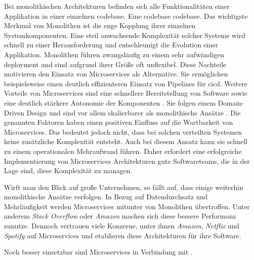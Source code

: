 Bei monolithischen Architekturen befinden sich alle Funktionalitäten einer Applikation in einer einzelnen \Gls{codebase}. Eine \Gls{codebase} \glsdesc{codebase}. Das wichtigste Merkmal von Monolithen ist die enge Kopplung ihrer einzelnen Systemkomponenten. Eine steil anwachsende Komplexität solcher Systeme wird schnell zu einer Herausforderung und entschleunigt die Evolution einer Applikation. \cite{028:Analyzing-Microservices-and-Monolithic-Systems} Monolithen führen zwangsläufig zu einem sehr aufwändigen \Gls{deployment} und sind aufgrund ihrer Größe oft unflexibel. Diese Nachteile motivieren den Einsatz von Microservices als Alternative. Sie ermöglichen beispielsweise einen deutlich effizienteren Einsatz von Pipelines für \Gls{cicd}. \cite{019:Advanced-DevOps-Environment-for-Microservices-based-Applications} Weitere Vorteile von Microservices sind eine schnellere Bereitstellung von Software sowie eine deutlich stärkere Autonomie der Komponenten \cite{019:Advanced-DevOps-Environment-for-Microservices-based-Applications,027:Containerized-Microservices-Deployment-Approach}. Sie folgen einem Domain-Driven Design \cite{019:Advanced-DevOps-Environment-for-Microservices-based-Applications} und sind vor allem skalierbarer als monolithische Ansätze \cite{019:Advanced-DevOps-Environment-for-Microservices-based-Applications,027:Containerized-Microservices-Deployment-Approach,028:Analyzing-Microservices-and-Monolithic-Systems}. Die genannten Faktoren haben einen positiven Einfluss auf die Wartbarkeit von Microservices. Das bedeutet jedoch nicht, dass bei solchen verteilten Systemen keine zusätzliche Komplexität entsteht. Auch bei diesem Ansatz kann sie schnell zu einem operationalen Mehraufwand führen. Daher erfordert eine erfolgreiche Implementierung von Microservices Architekturen gute Softwareteams, die in der Lage sind, diese Komplexität zu managen.

Wirft man den Blick auf große Unternehmen, so fällt auf, dass einige weiterhin monolithische Ansätze verfolgen. In Bezug auf Datendurchsatz und Mehrläufigkeit werden Microservices mitunter von Monolithen übertroffen. Unter anderem \textit{Stack Overflow} oder \textit{Amazon} machen sich diese bessere Performanz zunutze. Dennoch vertrauen viele Konzerne, unter ihnen \textit{Amazon}, \textit{Netflix} und \textit{Spotify} auf Microservices und etablieren diese Architekturen für ihre Software. \cite{028:Analyzing-Microservices-and-Monolithic-Systems}

Noch besser einsetzbar sind Microservices in Verbindung mit .
